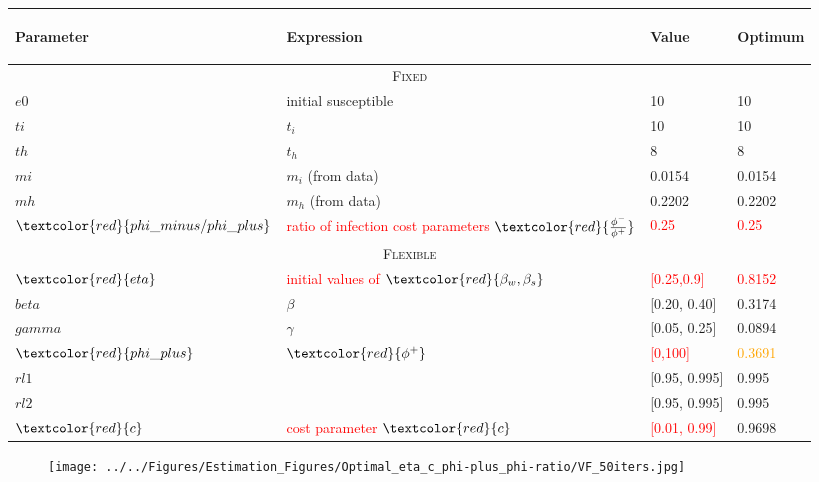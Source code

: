 \documentclass{../cls/NotesV2_Class}
\begin{document}
\begin{center}
\begin{tabular}[h]{ |p{3cm}||p{6cm}|p{2cm}|p{2cm}|  }
 \hline
 \begin{center}Parameter\end{center} & \begin{center}Expression\end{center} & \begin{center}Value\end{center} & \begin{center}Optimum\end{center} \\
 \hline
 \hline
 \multicolumn{4}{|c|}{\textsc{Fixed}} \\
 \hline
 $e0$   &  initial susceptible  & 10 & 10\\
 $ti$ & $t_i$ & 10 & 10 \\
 $th$ & $t_h$ & 8 & 8\\
 $mi$ & $m_i$ (from data) & 0.0154 & 0.0154 \\
 $mh$ & $m_h$ (from data) & 0.2202 & 0.2202\\
 $\textcolor{red}{phi\_minus/phi\_plus}$ & \textcolor{red}{ratio of infection cost parameters} $\textcolor{red}{\frac{\phi^-}{\phi^+}}$ & \textcolor{red}{0.25} & \textcolor{red}{0.25} \\
 \hline
 \multicolumn{4}{|c|}{\textsc{Flexible}} \\
 \hline
 $\textcolor{red}{eta}$ & \textcolor{red}{initial values of }$\textcolor{red}{\beta_w,\beta_s}$ & \textcolor{red}{[0.25,0.9]} & \textcolor{red}{0.8152} \\
 $beta$ & $\beta$ & [0.20, 0.40] & 0.3174\\
 $gamma$ & $\gamma$ & [0.05, 0.25] & 0.0894 \\
 $\textcolor{red}{phi\_plus}$ & $\textcolor{red}{\phi^+}$ & \textcolor{red}{[0,100]} & \textcolor{orange}{0.3691}\\
 $rl1$ & & [0.95, 0.995] & 0.995\\
 $rl2$ & & [0.95, 0.995] & 0.995\\
 $\textcolor{red}{c}$ & \textcolor{red}{cost parameter} $\textcolor{red}{c}$ & \textcolor{red}{[0.01, 0.99]} & 0.9698\\
 \hline
\end{tabular}
\end{center}

\begin{figure}[htbp!]
\texttt{[image: ../../Figures/Estimation\_Figures/Optimal\_eta\_c\_phi-plus\_phi-ratio/VF\_50iters.jpg]}
\end{figure}
\end{document}
